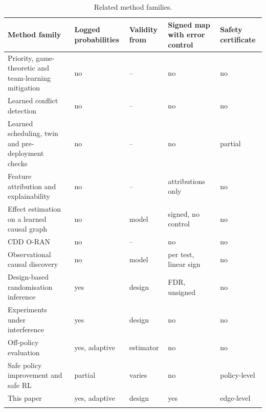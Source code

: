 \begin{table}[tbp]
\caption{Related method families.}
\label{tab:related}
\setlength{\tabcolsep}{3pt}
\begin{tabular*}{\textwidth}{@{\extracolsep\fill}>{\raggedright}p{}>{\raggedright}p{}>{\raggedright}p{}>{\raggedright}p{}>{\raggedright\arraybackslash}p{}@{}}
\toprule
Method family & Logged probabilities & Validity from & Signed map with error control & Safety certificate \\
\midrule
Priority, game-theoretic and team-learning mitigation~\cite{adamczyk2023conflict,wadud2025mobility,QACM2024,iturria2022matl}
 & no & -- & no & no \\
Learned conflict detection~\cite{alshami2026conflict,zolghadr2025conflict,santos2026conflictairan,varshney2025xai4c}
 & no & -- & no & no \\
Learned scheduling, twin and pre-deployment checks~\cite{cinemre2026scheduler,giannopoulos2025comix,PACIFISTA,zhang2026opentwin}
 & no & -- & no & partial \\
Feature attribution and explainability~\cite{lundberg2017shap,lundberg2020trees,fiandrino2023explora,brik2025xai}
 & no & -- & attributions only & no \\
Effect estimation on a learned causal graph~\cite{Sharma_2025}
 & no & model & signed, no control & no \\
CDD O-RAN~\cite{dahal2026cddoran}
 & no & -- & no & no \\
Observational causal discovery~\cite{granger1969causal,spirtes2000causation,zheng2018notears,strobl2019rcot,runge2019pcmci}
 & no & model & per test, linear sign & no \\
Design-based randomisation inference~\cite{imbens2015causal,bojinov2019timeseries,bojinov2023switchback,candes2018knockoffs}
 & yes & design & FDR, unsigned & no \\
Experiments under interference~\cite{aronow2017interference,basse2019interference,spang2021unbiased,alomar2023causalsim}
 & yes & design & no & no \\
Off-policy evaluation~\cite{dudik2014doubly,hadad2021adaptive}
 & yes, adaptive & estimator & no & no \\
Safe policy improvement and safe RL~\cite{thomas2015hcpi,gu2024safereview,alshiekh2018shield,nagib2024safe}
 & partial & varies & no & policy-level \\
\midrule
This paper
 & yes, adaptive & design & yes & edge-level \\
\botrule
\end{tabular*}
\end{table}

